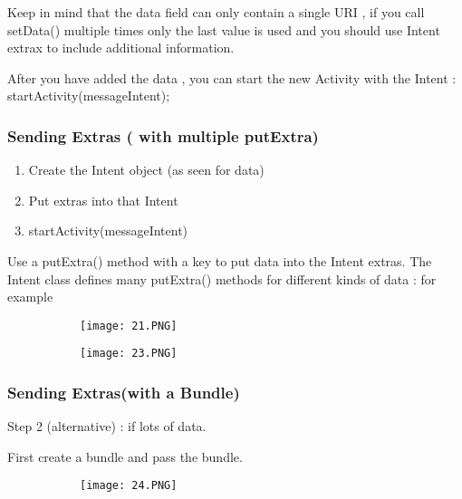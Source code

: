 \documentclass{article}
\begin{document}
  Keep in mind that the data field can only contain a single URI , if you call setData() multiple times only the last value is used and you should use Intent extrax to include additional information.

  After you have added the data , you can start the new Activity with the Intent : startActivity(messageIntent);


  \subsubsection{Sending Extras ( with multiple putExtra)}

  \begin{enumerate}
      \item Create the Intent object (as seen for data)
      \item Put extras into that Intent
      \item startActivity(messageIntent)
  \end{enumerate}

  Use a putExtra() method with a key to put data into the Intent extras. The Intent class defines many putExtra() methods for different kinds of data : for example


\begin{figure}[ht!]
  \centering
  \begin{subfigure}[b]{0.5\linewidth}
    \texttt{[image: 21.PNG]}
  \end{subfigure}
     \begin{subfigure}[b]{0.49\textwidth}
         \centering
         \texttt{[image: 23.PNG]}
     \end{subfigure}
\end{figure}

\subsubsection{Sending Extras(with a Bundle)}

Step 2 (alternative) : if lots of data.

First create a bundle and pass the bundle.

      \begin{figure}[ht!]
  \centering
  \begin{subfigure}[b]{0.6\linewidth}
    \texttt{[image: 24.PNG]}
  \end{subfigure}
  \end{figure}
\end{document}
